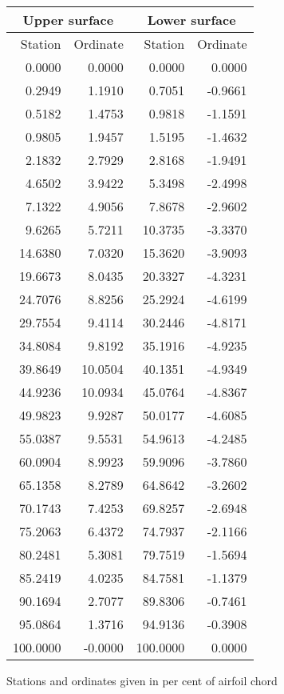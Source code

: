\documentclass[11pt]{book}
\begin{document}
 \hspace{4mm}
 \begin{tabular}{|r|r|r|r|} \hline 
 \multicolumn{2}{|c|}{Upper surface} & \multicolumn{2}{|c|}{Lower surface} \\
 \hline
 Station & Ordinate & Station & Ordinate \\
 \hline
0.0000 & 0.0000 & 0.0000 & 0.0000 \\
0.2949 & 1.1910 & 0.7051 & -0.9661 \\
0.5182 & 1.4753 & 0.9818 & -1.1591 \\
0.9805 & 1.9457 & 1.5195 & -1.4632 \\
2.1832 & 2.7929 & 2.8168 & -1.9491 \\
4.6502 & 3.9422 & 5.3498 & -2.4998 \\
7.1322 & 4.9056 & 7.8678 & -2.9602 \\
9.6265 & 5.7211 & 10.3735 & -3.3370 \\
14.6380 & 7.0320 & 15.3620 & -3.9093 \\
19.6673 & 8.0435 & 20.3327 & -4.3231 \\
24.7076 & 8.8256 & 25.2924 & -4.6199 \\
29.7554 & 9.4114 & 30.2446 & -4.8171 \\
34.8084 & 9.8192 & 35.1916 & -4.9235 \\
39.8649 & 10.0504 & 40.1351 & -4.9349 \\
44.9236 & 10.0934 & 45.0764 & -4.8367 \\
49.9823 & 9.9287 & 50.0177 & -4.6085 \\
55.0387 & 9.5531 & 54.9613 & -4.2485 \\
60.0904 & 8.9923 & 59.9096 & -3.7860 \\
65.1358 & 8.2789 & 64.8642 & -3.2602 \\
70.1743 & 7.4253 & 69.8257 & -2.6948 \\
75.2063 & 6.4372 & 74.7937 & -2.1166 \\
80.2481 & 5.3081 & 79.7519 & -1.5694 \\
85.2419 & 4.0235 & 84.7581 & -1.1379 \\
90.1694 & 2.7077 & 89.8306 & -0.7461 \\
95.0864 & 1.3716 & 94.9136 & -0.3908 \\
100.0000 & -0.0000 & 100.0000 & 0.0000 \\
 \hline 
 \end{tabular}
 \vspace{8mm}

Stations and ordinates given in per cent of airfoil chord
\end{document}
